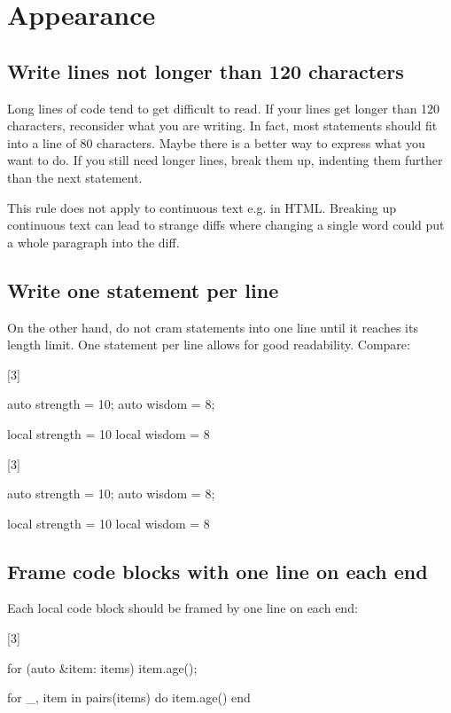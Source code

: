 \documentclass[a4paper,11pt]{scrreprt}
\newcommand{\marginMarker}[1]{%
\marginnote{%
    \hfill%
		\Huge{#1}%
}[3\baselineskip]%
}
\newcommand{\conforming}{%
\marginMarker{\textcolor{green}{\ding{51}}}%
}
\newcommand{\nonconforming}{%
\marginMarker{\textcolor{red}{\ding{55}}}%
}
\begin{document}
\chapter{Appearance}
\section{Write lines not longer than 120 characters}
Long lines of code tend to get difficult to read. If your lines get longer than 120 characters, reconsider what you are writing. In fact, most statements should fit into a line of 80 characters. Maybe there is a better way to express what you want to do. If you still need longer lines, break them up, indenting them further than the next statement.

This rule does not apply to continuous text e.g. in HTML. Breaking up continuous text can lead to strange diffs where changing a single word could put a whole paragraph into the diff.

\section{Write one statement per line}
On the other hand, do not cram statements into one line until it reaches its length limit. One statement per line allows for good readability. Compare:

\nonconforming{}
\begin{cppBox}
auto strength = 10; auto wisdom = 8;
\end{cppBox}
\begin{luaBox}
local strength = 10 local wisdom = 8
\end{luaBox}

\conforming{}
\begin{cppBox}
auto strength = 10;
auto wisdom = 8;
\end{cppBox}
\begin{luaBox}
local strength = 10
local wisdom = 8
\end{luaBox}

\section{Frame code blocks with one line on each end}
Each local code block should be framed by one line on each end:

\conforming{}
\begin{cppBox}
for (auto &item: items) {
    item.age();
}
\end{cppBox}
\begin{luaBox}
for _, item in pairs(items) do
    item.age()
end
\end{luaBox}
\end{document}
